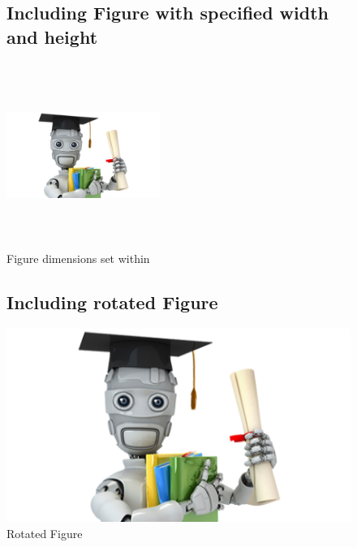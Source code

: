 \begin{figure}[!htbp]
\subsection{Including Figure with specified width and height}
\includegraphics[width=5cm, height=6cm]{"machineLearning"}
\caption[Modified length and width of the figure]{Figure dimensions set within }
\label{mlwFig}
\end{figure}

\begin{figure}[!htbp]
\subsection{Including rotated Figure}
\includegraphics[angle=180]{"machineLearning"}
\caption[Rotated Figure]{Rotated Figure}
\label{rotFig}
\end{figure}
